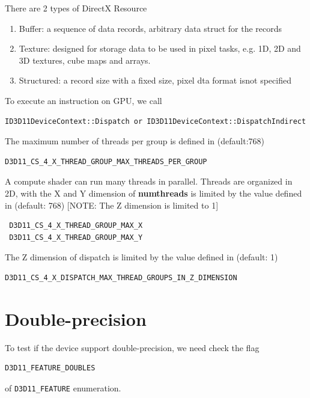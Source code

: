 There are 2 types of DirectX Resource
\begin{enumerate}
  \item Buffer: a sequence of data records, arbitrary data struct for the
  records
  \item Texture: designed for storage data to be used in pixel tasks, e.g. 1D,
  2D and 3D textures, cube maps and arrays.
  
  \item Structured: a record size with a fixed size, pixel dta format isnot
  specified
\end{enumerate}

To execute an instruction on GPU, we call 
\begin{verbatim}
ID3D11DeviceContext::Dispatch or ID3D11DeviceContext::DispatchIndirect 
\end{verbatim}

The maximum number of threads per group is defined in (default:768) 
\begin{verbatim}
D3D11_CS_4_X_THREAD_GROUP_MAX_THREADS_PER_GROUP 
\end{verbatim}

A compute shader can run many threads in parallel. Threads are organized in 2D,
with the X and Y dimension of {\bf numthreads} is limited by the value defined
in (default: 768) [NOTE: The Z dimension is limited to 1]
\begin{verbatim}
 D3D11_CS_4_X_THREAD_GROUP_MAX_X 
 D3D11_CS_4_X_THREAD_GROUP_MAX_Y
\end{verbatim}

The Z dimension of dispatch is limited by the value defined in (default: 1)
\begin{verbatim}
D3D11_CS_4_X_DISPATCH_MAX_THREAD_GROUPS_IN_Z_DIMENSION 
\end{verbatim}


\section{Double-precision}

To test if the device support double-precision, we need check the flag
\begin{verbatim}
D3D11_FEATURE_DOUBLES
\end{verbatim}
of \verb!D3D11_FEATURE! enumeration.

